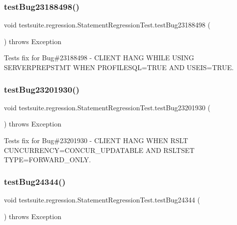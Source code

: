 \subsubsection{\texorpdfstring{test\+Bug23188498()}{testBug23188498()}}
{\footnotesize\ttfamily void testsuite.\+regression.\+Statement\+Regression\+Test.\+test\+Bug23188498 (\begin{DoxyParamCaption}{ }\end{DoxyParamCaption}) throws Exception}

Tests fix for Bug\#23188498 -\/ C\+L\+I\+E\+NT H\+A\+NG W\+H\+I\+LE U\+S\+I\+NG S\+E\+R\+V\+E\+R\+P\+R\+E\+P\+S\+T\+MT W\+H\+EN P\+R\+O\+F\+I\+L\+E\+S\+QL=T\+R\+UE A\+ND U\+S\+E\+IS=T\+R\+UE. \mbox{\label{classtestsuite_1_1regression_1_1_statement_regression_test_a3d0ac2b92441d18279f454eff53dff23}} 
\subsubsection{\texorpdfstring{test\+Bug23201930()}{testBug23201930()}}
{\footnotesize\ttfamily void testsuite.\+regression.\+Statement\+Regression\+Test.\+test\+Bug23201930 (\begin{DoxyParamCaption}{ }\end{DoxyParamCaption}) throws Exception}

Tests fix for Bug\#23201930 -\/ C\+L\+I\+E\+NT H\+A\+NG W\+H\+EN R\+S\+LT C\+U\+N\+C\+U\+R\+R\+E\+N\+CY=C\+O\+N\+C\+U\+R\+\_\+\+U\+P\+D\+A\+T\+A\+B\+LE A\+ND R\+S\+L\+T\+S\+ET T\+Y\+PE=F\+O\+R\+W\+A\+R\+D\+\_\+\+O\+N\+LY. \mbox{\label{classtestsuite_1_1regression_1_1_statement_regression_test_a4da675927e9f55846b0ea0781c439c48}} 
\subsubsection{\texorpdfstring{test\+Bug24344()}{testBug24344()}}
{\footnotesize\ttfamily void testsuite.\+regression.\+Statement\+Regression\+Test.\+test\+Bug24344 (\begin{DoxyParamCaption}{ }\end{DoxyParamCaption}) throws Exception}

